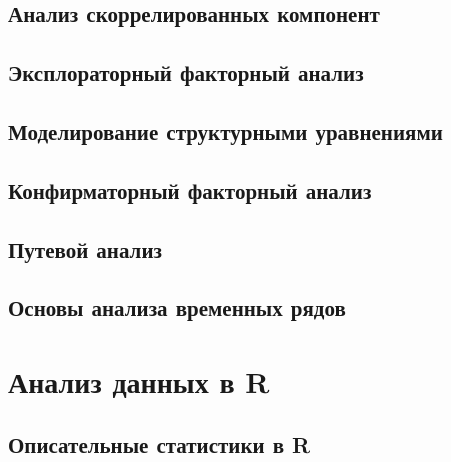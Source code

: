 \documentclass[
  letterpaper,
]{scrbook}
\theoremstyle{definition}
\theoremstyle{remark}
\begin{document}

\chapter{Анализ скоррелированных компонент}\label{andan-cca}


\chapter{Эксплораторный факторный анализ}\label{andan-efa}


\chapter{Моделирование структурными уравнениями}\label{andan-sem}


\chapter{Конфирматорный факторный анализ}\label{andan-cfa}


\chapter{Путевой анализ}\label{andan-path}


\chapter{Основы анализа временных рядов}\label{andan-timeseries}

\part{Анализ данных в R}


\chapter{Описательные статистики в R}\label{randan-descriptives}

\end{document}
